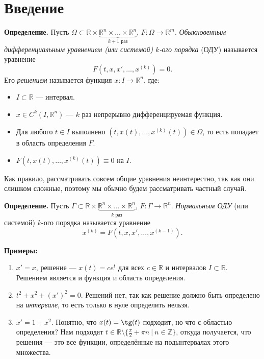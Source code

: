 \section{Введение}
\textbf{Определение.} Пусть $\Omega \subset \mathbb R \times \underbrace{\mathbb R^n \times \dots \times \mathbb R^n}_{\text{$k + 1$ раз}}$, $F: \Omega \to \mathbb R^m$.
\textit{Обыкновенным дифференциальным уравнением (или системой) $k$-ого порядка} (ОДУ) называется уравнение
\begin{equation}
    F(t, x, x', \dots, x^{(k)}) = 0.
\end{equation}
Его \textit{решением} называется функция $x: I \to \mathbb R^n$, где:
\begin{itemize}
    \item $I \subset \mathbb R$ --- интервал.
    \item $x \in C^k(I, \mathbb R^n)$ --- $k$ раз непрерывно дифференцируемая функция.
    \item Для любого $t \in I$ выполнено $(t, x(t), \dots, x^{(k)}(t)) \in \Omega$, то есть попадает в область определения $F$.
    \item $F(t, x(t), \dots, x^{(k)}(t)) \equiv 0$ на $I$.
\end{itemize}

Как правило, рассматривать совсем общие уравнения неинтерестно, так как они слишком сложные, поэтому мы обычно будем рассматривать частный случай.

\textbf{Определение.} Пусть $\Gamma \subset \mathbb R \times \underbrace{\mathbb R^n \times \dots \times \mathbb R^n}_{\text{$k$ раз}}$, $F: \Gamma \to \mathbb R^n$.
\textit{Нормальным ОДУ} (или системой) $k$-ого порядка называется уравнение
\begin{equation}
    x^{(k)} = F(t, x, x', \dots, x^{(k-1)}).
\end{equation}

\textbf{Примеры:}
\begin{enumerate}
    \item $x' = x$, решение --- $x(t) = ce^t$ для всех $c \in \mathbb R$ и интервалов $I \subset \mathbb R$.
        Решением является и функция и область определения.
    \item $t^2 + x^2 + (x')^2 = 0$. Решений нет, так как решение должно быть определено на \textit{интервале}, то есть только в нуле определить нельзя.
    \item $x' = 1 + x^2$. Понятно, что $x(t) = \tg(t)$ подходит, но что с областью определения?
        Нам подходят $t \in \mathbb R \setminus \{ \frac{\pi}{2} + \pi n~|~n \in \mathbb Z\}$, откуда получается, что решения --- это все функции, определённые на подынтервалах этого множества.
\end{enumerate}

